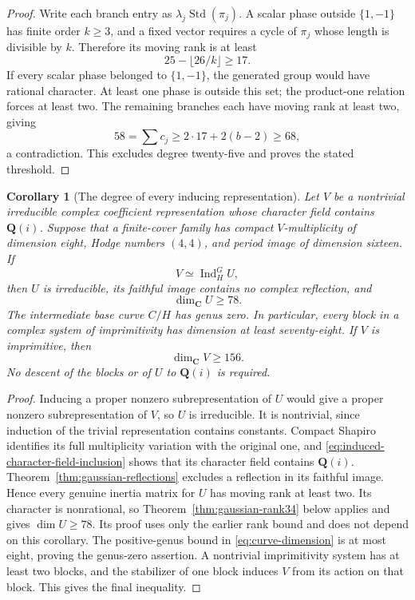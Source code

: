 \documentclass[11pt]{article}
\newtheorem{corollary}[theorem]{Corollary}
\theoremstyle{definition}
\theoremstyle{remark}
\newcommand{\Q}{\mathbf Q}
\newcommand{\C}{\mathbf C}
\begin{document}
\begin{proof}
Write each branch entry as $\lambda_j\operatorname{Std}(\pi_j)$.
A scalar phase outside $\{1,-1\}$ has finite order $k\ge3$, and a
fixed vector requires a cycle of $\pi_j$ whose length is divisible
by $k$. Therefore its moving rank is at least
\[
 25-\lfloor26/k\rfloor\ge17.
\]
If every scalar phase belonged to $\{1,-1\}$, the generated group
would have rational character. At least one phase is outside this
set; the product-one relation forces at least two. The remaining
branches each have moving rank at least two, giving
\[
 58=\sum c_j\ge2\cdot17+2(b-2)\ge68,
\]
a contradiction. This excludes degree twenty-five and proves the
 stated threshold.
\end{proof}

\begin{corollary}[The degree of every inducing representation]
\label{cor:gaussian-cover-rank}
Let $V$ be a nontrivial irreducible complex coefficient
representation whose character field contains $\Q(i)$.
Suppose that a finite-cover family has compact $V$-multiplicity
of dimension eight, Hodge numbers $(4,4)$, and period image of
dimension sixteen.  If
\[
 V\simeq\operatorname{Ind}_H^G U,
\]
then $U$ is irreducible, its faithful image contains no complex
reflection, and
\[
 \dim_{\C}U\geq78.
\]
The intermediate base curve $C/H$ has genus zero.
In particular, every block in a complex system of imprimitivity
has dimension at least seventy-eight.  If $V$ is imprimitive, then
\[
 \dim_{\C}V\geq156.
\]
No descent of the blocks or of $U$ to $\Q(i)$ is required.
\end{corollary}

\begin{proof}
Inducing a proper nonzero subrepresentation of $U$ would give
a proper nonzero subrepresentation of $V$, so $U$ is irreducible.
It is nontrivial, since induction of the trivial representation
contains constants.  Compact Shapiro identifies its full
multiplicity variation with the original one, and
\eqref{eq:induced-character-field-inclusion} shows that its
character field contains $\Q(i)$.
Theorem~\ref{thm:gaussian-reflections} excludes a reflection in
its faithful image.  Hence every genuine inertia matrix for
$U$ has moving rank at least two.  Its character is nonrational,
so Theorem~\ref{thm:gaussian-rank34} below applies and gives
$\dim U\geq78$. Its proof uses only the earlier rank bound
and does not depend on this corollary.
The positive-genus bound in \eqref{eq:curve-dimension} is at most
eight, proving the genus-zero assertion.  A nontrivial
imprimitivity system has at least two blocks, and the stabilizer
of one block induces $V$ from its action on that block.  This
gives the final inequality.
\end{proof}
\end{document}
